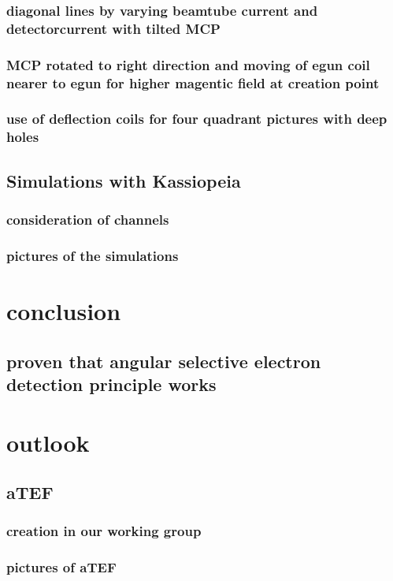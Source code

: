 \documentclass[11pt]{article} %
\begin{document}
			\subsubsection{diagonal lines by varying beamtube current and detectorcurrent with tilted MCP}
		\subsubsection{MCP rotated to right direction and moving of egun coil nearer to egun for higher magentic field at creation point}
		\subsubsection{use of deflection coils for four quadrant pictures with deep holes}

	\subsection{Simulations with Kassiopeia}
		\subsubsection{consideration of channels}
		\subsubsection{pictures of the simulations}




\newpage
\section{conclusion}
	\subsection{proven that angular selective electron detection principle works}

\newpage
\section{outlook}
	\subsection{aTEF}
		\subsubsection{creation in our working group}
		\subsubsection{pictures of aTEF}
\end{document}
